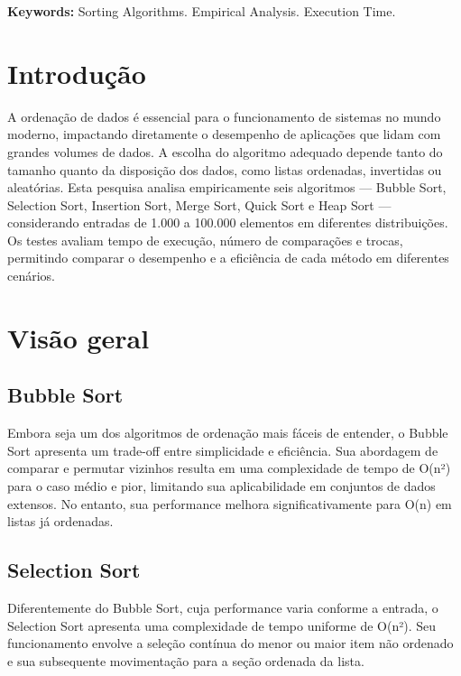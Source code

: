 \documentclass[12pt, a4paper]{report}
\begin{document}
\vspace{0.5cm}

\textbf{Keywords:} Sorting Algorithms. Empirical Analysis. Execution Time.

\chapter{Introdução}
A ordenação de dados é essencial para o funcionamento de sistemas no mundo moderno, impactando diretamente o desempenho de aplicações que lidam com grandes volumes de dados. A escolha do algoritmo adequado depende tanto do tamanho quanto da disposição dos dados, como listas ordenadas, invertidas ou aleatórias. Esta pesquisa analisa empiricamente seis algoritmos — Bubble Sort, Selection Sort, Insertion Sort, Merge Sort, Quick Sort e Heap Sort — considerando entradas de 1.000 a 100.000 elementos em diferentes distribuições. Os testes avaliam tempo de execução, número de comparações e trocas, permitindo comparar o desempenho e a eficiência de cada método em diferentes cenários.

\chapter{Visão geral}
\section{Bubble Sort}
Embora seja um dos algoritmos de ordenação mais fáceis de entender, o Bubble Sort apresenta um trade-off entre simplicidade e eficiência. Sua abordagem de comparar e permutar vizinhos resulta em uma complexidade de tempo de O(n²) para o caso médio e pior, limitando sua aplicabilidade em conjuntos de dados extensos. No entanto, sua performance melhora significativamente para O(n) em listas já ordenadas.

\section{Selection Sort}
Diferentemente do Bubble Sort, cuja performance varia conforme a entrada, o Selection Sort apresenta uma complexidade de tempo uniforme de O(n²). Seu funcionamento envolve a seleção contínua do menor ou maior item não ordenado e sua subsequente movimentação para a seção ordenada da lista.
\end{document}
